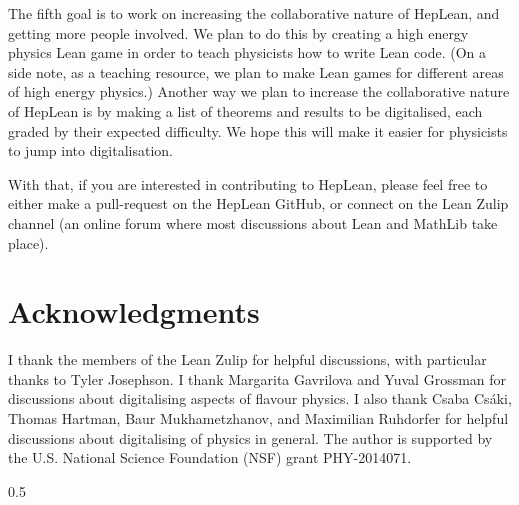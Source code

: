 \documentclass[a4paper, 11pt]{article}
\begin{document}
The fifth goal is to work on increasing the collaborative nature of HepLean, and getting more people involved. We plan to do this  by creating a high energy physics Lean game in order to teach physicists how to write Lean code. (On a side note, as a teaching resource, we plan to make Lean games for different areas of high energy physics.) Another way we plan to increase the collaborative nature of HepLean is by making a list of theorems and results to be digitalised, each graded by their expected difficulty. We hope this will make it easier for physicists to jump into digitalisation.

With that, if you are interested in contributing to HepLean, please feel free to either make a pull-request on the HepLean GitHub, or connect on the Lean Zulip channel (an online forum where most discussions about Lean and MathLib take place). 

\section*{Acknowledgments}

I thank  the  members of the Lean Zulip  for helpful discussions, with particular thanks to Tyler Josephson. I thank Margarita Gavrilova and Yuval Grossman for discussions about digitalising  aspects of flavour physics. I also thank  Csaba Cs\'aki,  Thomas Hartman, Baur Mukhametzhanov, and Maximilian Ruhdorfer for helpful discussions about digitalising of physics in general. The author is supported by the U.S. National Science Foundation (NSF) grant PHY-2014071.


\begin{spacing}{0.5}

\end{spacing}


\end{document}
